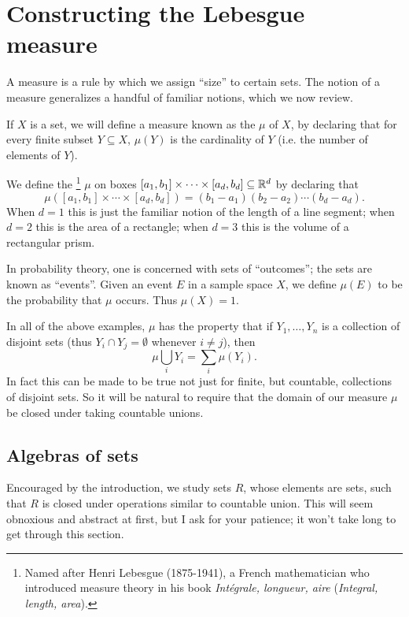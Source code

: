 \chapter{Constructing the Lebesgue measure}\label{ch:ch1}\label{measureChapter}
A measure is a rule by which we assign ``size'' to certain sets.
The notion of a measure generalizes a handful of familiar notions, which we now review.
\begin{example}\label{examples of measures}
If $X$ is a set, we will define a measure known as the  $\mu$ of $X$, by declaring that for every finite subset $Y \subseteq X$, $\mu(Y)$ is the cardinality of $Y$ (i.e. the number of elements of $Y$).

We define the \footnote{Named after Henri Lebesgue (1875-1941), a French mathematician who introduced measure theory in his book \emph{Intégrale, longueur, aire} (\emph{Integral, length, area}).}
$\mu$ on boxes $[a_1, b_1] \times \cdots \times [a_d, b_d] \subseteq \mathbb{R}^d$ by declaring that
\[\mu([a_1, b_1] \times \cdots \times [a_d, b_d]) = (b_1 - a_1)(b_2 - a_2)\cdots(b_{d} - a_d).\]
When $d = 1$ this is just the familiar notion of the length of a line segment; when $d = 2$ this is the area of a rectangle; when $d = 3$ this is the volume of a rectangular prism.

In probability theory, one is concerned with sets of ``outcomes''; the sets are known as ``events''. Given an event $E$ in a sample space $X$, we define $\mu(E)$ to be the probability that $\mu$ occurs. Thus $\mu(X) = 1$.
\end{example}

\begin{subsec}
In all of the above examples, $\mu$ has the property that if $Y_1, \dots, Y_{n}$ is a collection of disjoint sets (thus $Y_{i} \cap Y_{j} = \emptyset$ whenever $i \neq j$), then
\[\mu\bigcup_{i} Y_{i} = \sum_{i} \mu(Y_i).\]
In fact this can be made to be true not just for finite, but countable, collections of disjoint sets.
So it will be natural to require that the domain of our measure $\mu$ be closed under taking countable unions.
\end{subsec}

\section{Algebras of sets}
Encouraged by the introduction, we study sets $R$, whose elements are sets, such that $R$ is closed under operations similar to countable union.
This will seem obnoxious and abstract at first, but I ask for your patience; it won't take long to get through this section.

